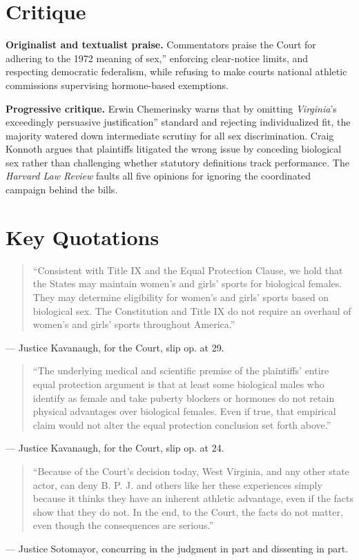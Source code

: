 \documentclass[12pt]{article}
\begin{document}
\section{Critique}

\textbf{Originalist and textualist praise.} Commentators praise the Court for adhering to the 1972 meaning of sex,'' enforcing clear-notice limits, and respecting democratic federalism, while refusing to make courts national athletic commissions supervising hormone-based exemptions.

\textbf{Progressive critique.} Erwin Chemerinsky warns that by omitting \textit{Virginia}'s exceedingly persuasive justification'' standard and rejecting individualized fit, the majority watered down intermediate scrutiny for all sex discrimination. Craig Konnoth argues that plaintiffs litigated the wrong issue by conceding biological sex rather than challenging whether statutory definitions track performance. The \textit{Harvard Law Review} faults all five opinions for ignoring the coordinated campaign behind the bills.

\section{Key Quotations}

\begin{quote}
``Consistent with Title IX and the Equal Protection Clause, we hold that the States may maintain women's and girls' sports for biological females. They may determine eligibility for women's and girls' sports based on biological sex. The Constitution and Title IX do not require an overhaul of women's and girls' sports throughout America.''
\end{quote}
\noindent --- Justice Kavanaugh, for the Court, slip op. at 29.

\begin{quote}
``The underlying medical and scientific premise of the plaintiffs' entire equal protection argument is that at least some biological males who identify as female and take puberty blockers or hormones do not retain physical advantages over biological females. Even if true, that empirical claim would not alter the equal protection conclusion set forth above.''
\end{quote}
\noindent --- Justice Kavanaugh, for the Court, slip op. at 24.

\begin{quote}
``Because of the Court's decision today, West Virginia, and any other state actor, can deny B. P. J. and others like her these experiences simply because it thinks they have an inherent athletic advantage, even if the facts show that they do not. In the end, to the Court, the facts do not matter, even though the consequences are serious.''
\end{quote}
\noindent --- Justice Sotomayor, concurring in the judgment in part and dissenting in part.
\end{document}

